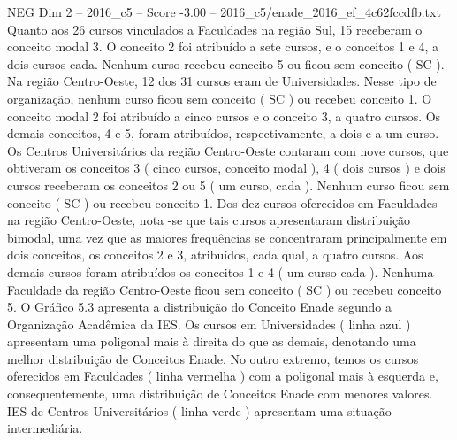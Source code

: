 \begin{textsample}{NEG Dim 2 – 2016\_c5 – Score -3.00 – 2016\_c5/enade\_2016\_ef\_4c62fccdfb.txt}
Quanto aos 26 cursos vinculados a Faculdades na região Sul, 15 receberam o conceito modal 3.
O conceito 2 foi atribuído a sete cursos, e o conceitos 1 e 4, a dois cursos cada.
Nenhum curso recebeu conceito 5 ou ficou sem conceito ( SC ).
Na região Centro-Oeste, 12 dos 31 cursos eram de Universidades.
Nesse tipo de organização, nenhum curso ficou sem conceito ( SC ) ou recebeu conceito 1.
O conceito modal 2 foi atribuído a cinco cursos e o conceito 3, a quatro cursos.
Os demais conceitos, 4 e 5, foram atribuídos, respectivamente, a dois e a um curso.
Os Centros Universitários da região Centro-Oeste contaram com nove cursos, que obtiveram os conceitos 3 ( cinco cursos, conceito modal ), 4 ( dois cursos ) e dois cursos receberam os conceitos 2 ou 5 ( um curso, cada ).
Nenhum curso ficou sem conceito ( SC ) ou recebeu conceito 1.
Dos dez cursos oferecidos em Faculdades na região Centro-Oeste, nota -se que tais cursos apresentaram distribuição bimodal, uma vez que as maiores frequências se concentraram principalmente em dois conceitos, os conceitos 2 e 3, atribuídos, cada qual, a quatro cursos.
Aos demais cursos foram atribuídos os conceitos 1 e 4 ( um curso cada ).
Nenhuma Faculdade da região Centro-Oeste ficou sem conceito ( SC ) ou recebeu conceito 5.
O Gráfico 5.3 apresenta a distribuição do Conceito Enade segundo a Organização Acadêmica da IES.
Os cursos em Universidades ( linha azul ) apresentam uma poligonal mais à direita do que as demais, denotando uma melhor distribuição de Conceitos Enade.
No outro extremo, temos os cursos oferecidos em Faculdades ( linha vermelha ) com a poligonal mais à esquerda e, consequentemente, uma distribuição de Conceitos Enade com menores valores.
IES de Centros Universitários ( linha verde ) apresentam uma situação intermediária.

\end{textsample}
